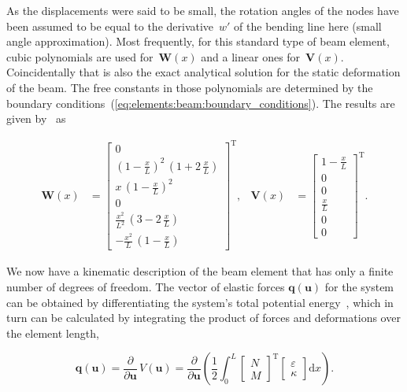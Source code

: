 As the displacements were said to be small, the rotation angles of the nodes have been assumed to be equal to the derivative~$w'$ of the bending line here (small angle approximation).
Most frequently, for this standard type of beam element, cubic polynomials are used for~$\boldsymbol{W}(x)$ and a linear ones for~$\boldsymbol{V}(x)$. Coincidentally that is also the exact analytical solution for the static deformation of the beam. The free constants in those polynomials are determined by the boundary conditions~(\ref{eq:elements:beam:boundary_conditions}). The results are given by~\cite{bib:tm4} as

\begin{align}
\boldsymbol{W}(x) &=
\begin{bmatrix}
0\\
(1-\frac{x}{L})^2\,(1+2\,\frac{x}{L})\\
x\,(1-\frac{x}{L})^2\\
0\\
\frac{x^2}{L^2}\,(3-2\,\frac{x}{L})\\
-\frac{x^2}{L}\,(1-\frac{x}{L})
\end{bmatrix}^\mathrm{T},
&
\boldsymbol{V}(x) &=
\begin{bmatrix}
1-\frac{x}{L}\\
0\\
0\\
\frac{x}{L}\\
0\\
0
\end{bmatrix}^\mathrm{T}.
\end{align}

We now have a kinematic description of the beam element that has only a finite number of degrees of freedom. The vector of elastic forces $\boldsymbol{q}(\boldsymbol{u})$ for the system can be obtained by differentiating the system's total potential energy~\cite{bib:wiki-lagrange}, which in turn can be calculated by integrating the product of forces and deformations over the element length,

\begin{equation}
\boldsymbol{q}(\boldsymbol{u}) = \frac{\partial}{\partial \boldsymbol{u}}\,V(\boldsymbol{u}) = \frac{\partial}{\partial \boldsymbol{u}}\left(\frac{1}{2}\int_0^L
\begin{bmatrix}
N\\
M
\end{bmatrix}^\mathrm{T}
\begin{bmatrix}
\varepsilon\\
\kappa
\end{bmatrix}
\mathrm{d}x\right).\label{eq:beam-linear-energy-1}
\end{equation}

